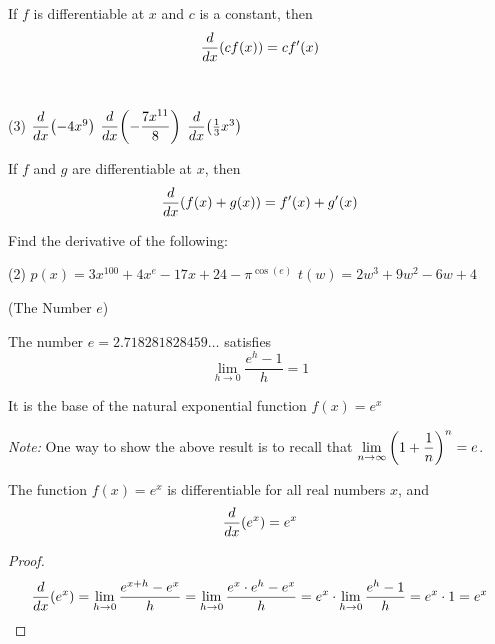 \documentclass[mathNotesPreamble]{subfiles}
\begin{document}
  \begin{thmBox*}
    If $f$ is differentiable at $x$ and $c$ is a constant, then
      $$\dfrac{d}{dx}{\left(cf(x)\right)}=cf'(x)$$
  \end{thmBox*}

\begin{ex*}\ 
  \begin{tasks}(3)
    \task[] $\dfrac{d}{dx}{\left(-4x^9\right)}$
    \task[] $\dfrac{d}{dx}{\left(-\dfrac{7x^{11}}{8}\right)}$
    \task[] $\dfrac{d}{dx}{\left(\frac{1}{3}x^3\right)}$
  \end{tasks}
\end{ex*}
\vspace*{\stretch{1}}

\begin{thmBox*}
  If $f$ and $g$ are differentiable at $x$, then 
    $$\dfrac{d}{dx}{\left(f(x)+g(x)\right)}=f'(x)+g'(x)$$
\end{thmBox*}

\begin{ex*}
  Find the derivative of the following:
  \begin{tasks}(2)
    \task[] $p(x)=3x^{100}+4x^e-17x+24-\pi^{\cos(e)}$
    \task[] $t(w)=2w^3+9w^2-6w+4$
  \end{tasks}
\end{ex*}
\pagebreak

\begin{defn*}(The Number $e$)

  The number $e=2.718281828459\dots$ satisfies
    $$\lim_{h\to 0} \dfrac{e^h-1}{h}=1$$

  It is the base of the natural exponential function $f(x)=e^x$
\end{defn*}
\textit{Note:} One way to show the above result is to recall that $\displaystyle\lim_{n\to \infty} {\left(1+\dfrac{1}{n}\right)}^n=e$.
\vspace*{30pt}

\begin{thmBox*}
  The function $f(x)=e^x$ is differentiable for all real numbers $x$, and 
    $$\dfrac{d}{dx}{\left(e^x\right)}=e^x$$
\end{thmBox*}
\vspace*{20pt}

\begin{proof}
  $$\dfrac{d}{dx}{\left(e^x\right)}
      =\lim_{h\to 0}\dfrac{e^{x+h}-e^x}{h}
      =\lim_{h\to 0} \dfrac{e^x\cdot e^h-e^x}{h}
      =e^x\cdot\lim_{h\to 0} \dfrac{e^h-1}{h}
      =e^x\cdot 1=e^x$$
\end{proof}
\vspace*{20pt}
\end{document}
